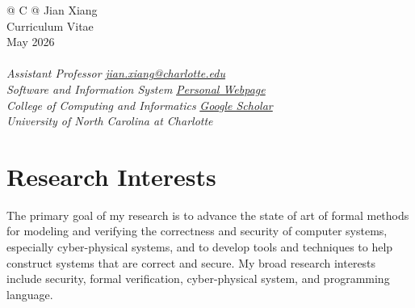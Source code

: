 \documentclass[11pt]{article}
\begin{document}
\renewcommand{\baselinestretch}{1.2} 

\pagestyle{empty} 


\begin{tabularx}{\linewidth}{@{} C @{}}
\Huge{\textsf{Jian Xiang}} \\[7.5pt]
Curriculum Vitae  \\
May 2026\\
\\
\noindent \textit{Assistant Professor} \hfill \href{mailto:jian.xiang@charlotte.edu}{\textit{jian.xiang@charlotte.edu}} \\
\noindent \textit{Software and Information System} \hfill { \href{https://www.jianxiang.info}{\textit{Personal Webpage}} } \\
\noindent \textit{College of Computing and Informatics} \hfill  { \href{https://scholar.google.com/citations?user=OMtFoaIAAAAJ&hl=en}{\textit{Google Scholar}} } \\
\noindent \textit{University of North Carolina at Charlotte}     \hfill  { } \\
\end{tabularx}




\section{Research Interests}

The primary goal of my research is to advance the state of art of formal methods for modeling and verifying the correctness and security of computer systems, especially cyber-physical systems, and to develop tools and techniques to help construct systems that are correct and secure.
%
My broad research interests include security, formal verification, cyber-physical system, and programming language.
\end{document}
